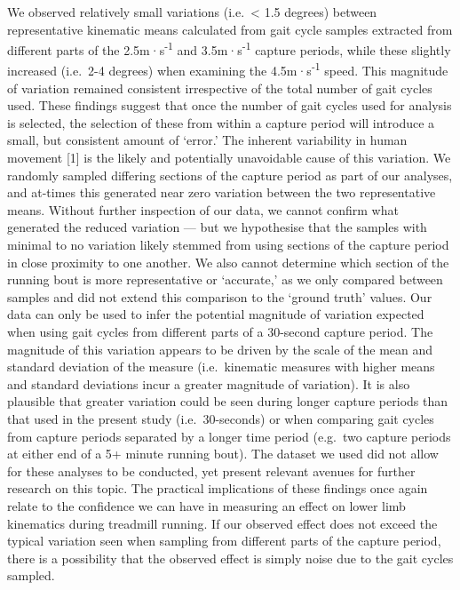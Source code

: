 \documentclass[]{elsarticle} %
\begin{document}
We observed relatively small variations (i.e.~\textless{} 1.5 degrees)
between representative kinematic means calculated from gait cycle
samples extracted from different parts of the 2.5m·s\textsuperscript{-1}
and 3.5m·s\textsuperscript{-1} capture periods, while these slightly
increased (i.e.~2-4 degrees) when examining the
4.5m·s\textsuperscript{-1} speed. This magnitude of variation remained
consistent irrespective of the total number of gait cycles used. These
findings suggest that once the number of gait cycles used for analysis
is selected, the selection of these from within a capture period will
introduce a small, but consistent amount of `error.' The inherent
variability in human movement {[}1{]} is the likely and potentially
unavoidable cause of this variation. We randomly sampled differing
sections of the capture period as part of our analyses, and at-times
this generated near zero variation between the two representative means.
Without further inspection of our data, we cannot confirm what generated
the reduced variation --- but we hypothesise that the samples with
minimal to no variation likely stemmed from using sections of the
capture period in close proximity to one another. We also cannot
determine which section of the running bout is more representative or
`accurate,' as we only compared between samples and did not extend this
comparison to the `ground truth' values. Our data can only be used to
infer the potential magnitude of variation expected when using gait
cycles from different parts of a 30-second capture period. The magnitude
of this variation appears to be driven by the scale of the mean and
standard deviation of the measure (i.e.~kinematic measures with higher
means and standard deviations incur a greater magnitude of variation).
It is also plausible that greater variation could be seen during longer
capture periods than that used in the present study (i.e.~30-seconds) or
when comparing gait cycles from capture periods separated by a longer
time period (e.g.~two capture periods at either end of a 5+ minute
running bout). The dataset we used did not allow for these analyses to
be conducted, yet present relevant avenues for further research on this
topic. The practical implications of these findings once again relate to
the confidence we can have in measuring an effect on lower limb
kinematics during treadmill running. If our observed effect does not
exceed the typical variation seen when sampling from different parts of
the capture period, there is a possibility that the observed effect is
simply noise due to the gait cycles sampled.
\end{document}
